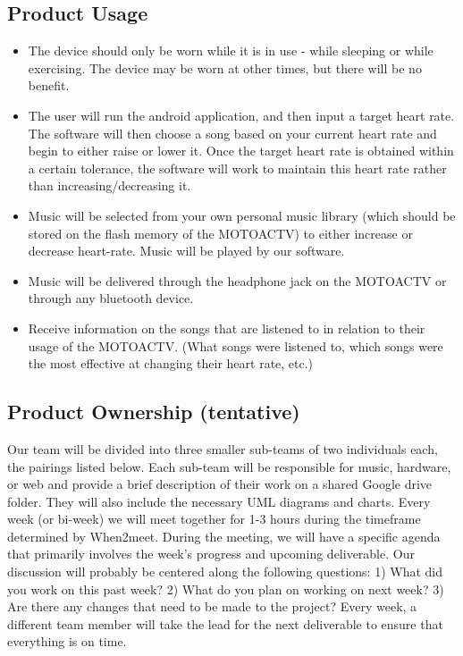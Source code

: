 \documentclass[letterpaper,english, 12pt]{scrreprt}
\begin{document}
\subsection{Product Usage}
\begin{itemize}
	\item The device should only be worn while it is in use - while sleeping or while exercising. The device may be worn at other times, but there will be no benefit.
	\item The user will run the android application, and then input a target heart rate. The software will then choose a song based on your current heart rate and begin to either raise or lower it. Once the target heart rate is obtained within a certain tolerance, the software will work to maintain this heart rate rather than increasing/decreasing it.
	\item Music will be selected from your own personal music library (which should be stored on the flash memory of the MOTOACTV) to either increase or decrease heart-rate. Music will be played by our software.
	\item Music will be delivered through the headphone jack on the MOTOACTV or through any bluetooth device.
	\item Receive information on the songs that are listened to in relation to their usage of the MOTOACTV. (What songs were listened to, which songs were the most effective at changing their heart rate, etc.)
\end{itemize}

\subsection{Product Ownership (tentative)}
Our team will be divided into three smaller sub-teams of two individuals each, the pairings listed below. Each sub-team will be responsible for music, hardware, or web and provide a brief description of their work on a shared Google drive folder. They will also include the necessary UML diagrams and charts. Every week (or bi-week) we will meet together for 1-3 hours during the timeframe determined by When2meet. During the meeting, we will have a specific agenda that primarily involves the week's progress and upcoming deliverable. Our discussion will probably be centered along the following questions: 1) What did you work on this past week? 2) What do you plan on working on next week? 3) Are there any changes that need to be made to the project? Every week, a different team member will take the lead for the next deliverable to ensure that everything is on time.          	
\end{document}
